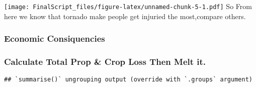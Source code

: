 \documentclass[
]{article}
\newenvironment{Shaded}{\begin{snugshade}}{\end{snugshade}}
\newcommand{\DataTypeTok}[1]{\textcolor[rgb]{0.13,0.29,0.53}{#1}}
\newcommand{\KeywordTok}[1]{\textcolor[rgb]{0.13,0.29,0.53}{\textbf{#1}}}
\newcommand{\NormalTok}[1]{#1}
\newcommand{\OperatorTok}[1]{\textcolor[rgb]{0.81,0.36,0.00}{\textbf{#1}}}
\newcommand{\StringTok}[1]{\textcolor[rgb]{0.31,0.60,0.02}{#1}}
\begin{document}
\texttt{[image: FinalScript\_files/figure-latex/unnamed-chunk-5-1.pdf]}
So From here we know that tornado make people get injuried the
most,compare others.

\hypertarget{economic-consiquencies}{%
\subsubsection{Economic Consiquencies}\label{economic-consiquencies}}

\hypertarget{calculate-total-prop-crop-loss-then-melt-it.}{%
\subsubsection{Calculate Total Prop \& Crop Loss Then Melt
it.}\label{calculate-total-prop-crop-loss-then-melt-it.}}

\begin{Shaded}
\end{Shaded}

\begin{verbatim}
## `summarise()` ungrouping output (override with `.groups` argument)
\end{verbatim}
\end{document}
